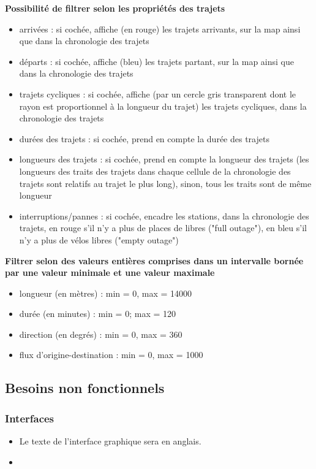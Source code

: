 \documentclass[12pt]{article}
\begin{document}
				\textbf{Possibilité de filtrer selon les propriétés des trajets}\\
					\begin{itemize}
						\item arrivées : si cochée, affiche (en rouge) les trajets arrivants, sur la map ainsi que dans la chronologie des trajets
						\item départs : si cochée, affiche (bleu) les trajets partant, sur la map ainsi que dans la chronologie des trajets
						\item trajets cycliques : si cochée, affiche (par un cercle gris transparent dont le rayon est proportionnel à la longueur du trajet) les trajets cycliques, dans la chronologie des trajets
						\item durées des trajets : si cochée, prend en compte la durée des trajets
						\item longueurs des trajets : si cochée, prend en compte la longueur des trajets (les longueurs des traits des trajets dans chaque cellule de la chronologie des trajets sont relatifs au trajet le plus long), sinon, tous les  traits sont de même longueur
						\item interruptions/pannes : si cochée, encadre les stations, dans la chronologie des trajets, en rouge s'il n'y a plus de places de libres ("full outage"), en bleu s'il n'y a plus de vélos libres ("empty outage")
					\end{itemize}
					
				\textbf{Filtrer selon des valeurs entières comprises dans un intervalle bornée par une valeur minimale et une valeur maximale}\\
					\begin{itemize}
						\item longueur (en mètres) : min = 0, max = 14000
						\item durée (en minutes) : min = 0; max = 120 
						\item direction (en degrés) : min = 0, max = 360
						\item flux d'origine-destination : min = 0, max = 1000
					\end{itemize}

		\subsection{Besoins non fonctionnels}
			\subsubsection{Interfaces}
				\begin{itemize}
					\item Le texte de l'interface graphique sera en anglais.
					\item 
				\end{itemize}
\end{document}

